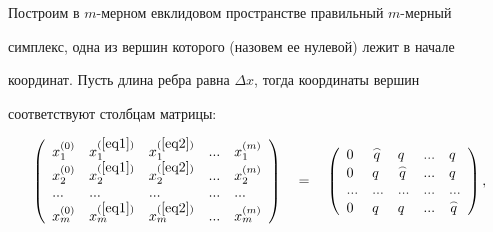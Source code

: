 \documentclass [12pt]{article}
\begin{document}
Построим в $m$-мерном евклидовом пространстве правильный $m$-мерный 

симплекс, одна из вершин которого (назовем ее нулевой) лежит в начале 

координат. Пусть длина ребра равна $\Delta x$, тогда координаты вершин 

соответствуют столбцам матрицы:





\[

\left( {{\begin{array}{*{20}c}

 {x_1^{(0)} } \hfill & {x_1^{(\ref{eq1})} } \hfill & {x_1^{(\ref{eq2})} } \hfill & {...} 

\hfill & {x_1^{(m)} } \hfill \\

 {x_2^{(0)} } \hfill & {x_2^{(\ref{eq1})} } \hfill & {x_2^{(\ref{eq2})} } \hfill & {...} 

\hfill & {x_2^{(m)} } \hfill \\

 {...} \hfill & {...} \hfill & {...} \hfill & {...} \hfill & {...} \hfill \\

 {x_m^{(0)} } \hfill & {x_m^{(\ref{eq1})} } \hfill & {x_m^{(\ref{eq2})} } \hfill & {...} 

\hfill & {x_m^{(m)} } \hfill \\

\end{array} }} \right) \quad = 

\quad

\left( {{\begin{array}{*{20}c}

 0 \hfill & 

\mathord{\buildrel{\lower3pt\hbox{$\scriptscriptstyle\frown$}}\over {q}} 

\hfill & q \hfill & {...} \hfill & q \hfill \\

 0 \hfill & q \hfill & 

\mathord{\buildrel{\lower3pt\hbox{$\scriptscriptstyle\frown$}}\over {q}} 

\hfill & {...} \hfill & q \hfill \\

 {...} \hfill & {...} \hfill & {...} \hfill & {...} \hfill & {...} \hfill \\

 0 \hfill & q \hfill & q \hfill & {...} \hfill & 

\mathord{\buildrel{\lower3pt\hbox{$\scriptscriptstyle\frown$}}\over {q}} 

\hfill \\

\end{array} }} \right),

\]
\end{document}
